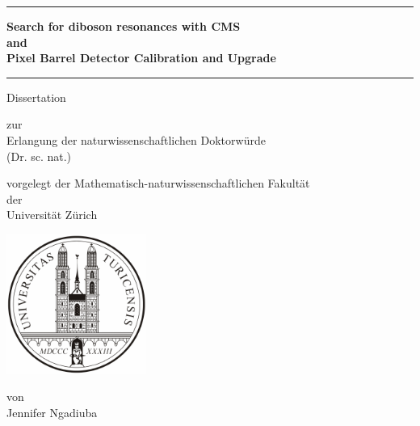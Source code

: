 

\begin{center}

  \thispagestyle{empty}
  {\parindent0cm
   \rule{\linewidth}{.7ex}}
  \begin{center}

    \bfseries\LARGE
    Search for diboson resonances with CMS\\ 
    and\\ 
    Pixel Barrel Detector 
    Calibration and Upgrade
  \end{center}
  \rule{\linewidth}{.7ex}

\par
\vspace{0.4 in}

{\LARGE Dissertation}
\vspace{0.1in}

zur \\
Erlangung der 
naturwissenschaftlichen Doktorw\"urde \\
(Dr. sc. nat.) \\
\par
\vspace{0.1in}


vorgelegt der Mathematisch-naturwissenschaftlichen Fakult\"at \\
der \\
\vspace{0.05in}
{\LARGE Universit\"at Z\"urich}
\par
\vspace{0.3in}

\includegraphics[width=1.8in]{zurich_logo}

\vspace{0.3in}
von \\
\vspace{0.05in}
{\LARGE Jennifer Ngadiuba} \\
\par
\vspace{0.4in}



\end{center}

